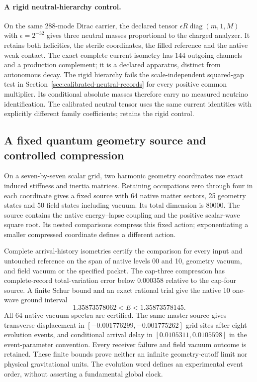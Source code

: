 \paragraph{A rigid neutral-hierarchy control.}
On the same 288-mode Dirac carrier, the declared tensor
$\epsilon R\operatorname{diag}(m,1,M)$ with $\epsilon=2^{-32}$
gives three neutral masses proportional to the charged analyzer.
It retains both helicities, the sterile coordinates, the filled reference
and the native weak contact. The exact complete current isometry has
144 outgoing channels and a production complement; it is a declared
apparatus, distinct from autonomous decay. The rigid hierarchy fails
the scale-independent squared-gap test in
Section~\ref{sec:calibrated-neutral-records} for every positive common
multiplier. Its conditional absolute masses therefore carry no measured
neutrino identification. The calibrated neutral tensor uses the same
current identities with explicitly different family coefficients;
 retains the rigid control.

\subsection{A fixed quantum geometry source and controlled compression}

On a seven-by-seven scalar grid, two harmonic geometry coordinates use
exact induced stiffness and inertia matrices. Retaining occupations zero
through four in each coordinate gives a fixed source with 64 native matter
sectors, 25 geometry states and 50 field states including vacuum. Its total
dimension is 80000. The source contains the native energy--lapse coupling
and the positive scalar-wave square root. Its nested comparisons compress
this fixed action; exponentiating a smaller compressed coordinate defines
a different action.

Complete arrival-history isometries certify the comparison for every input
and untouched reference on the span of native levels 00 and 10, geometry
vacuum, and field vacuum or the specified packet. The cap-three compression
has complete-record total-variation error below 0.000358 relative to the
cap-four source. A finite Schur bound and an exact rational trial give the
native 10 one-wave ground interval
\[
  1.35873578062 < E < 1.35873578145.
\]
All 64 native vacuum spectra are certified. The same master source gives
transverse displacement in
$[-0.001776299,-0.001775262]$ grid sites after eight evolution events,
and conditional arrival delay in
$[0.0105311,0.0105598]$ in the event-parameter convention.
Every receiver failure and field vacuum outcome is retained.
These finite bounds prove neither an infinite geometry-cutoff limit nor
physical gravitational units. The evolution word defines an experimental
event order, without asserting a fundamental global clock.


